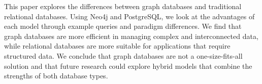 This paper explores the differences between graph databases and traditional relational databases. Using Neo4j and PostgreSQL, we look at the advantages of each model through example queries and paradigm differences. We find that graph databases are more efficient in managing complex and interconnected data, while relational databases are more suitable for applications that require structured data. We conclude that graph databases are not a one-size-fits-all solution and that future research could explore hybrid models that combine the strengths of both database types.